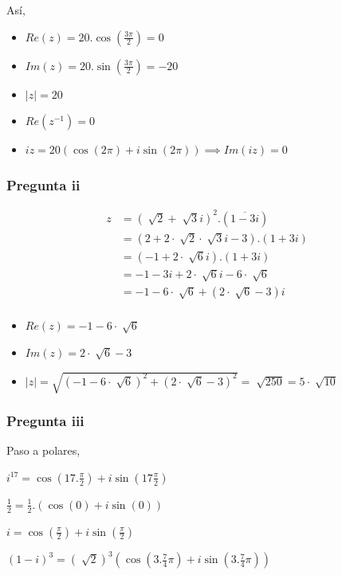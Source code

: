Así,
\begin{itemize}
    \item $ Re(z) = 20. \cos(\frac{3\pi}{2}) = 0 $
    \item $ Im(z) = 20. \sin(\frac{3\pi}{2}) = -20 $
    \item $ |z| = 20 $
    \item $ Re(z^{-1}) = 0 $
    \item $ iz = 20(\cos(2\pi)+i\sin(2\pi)) \implies Im(iz) = 0 $
\end{itemize}

\subsubsection{Pregunta ii}

\begin{align*}
    z &= (\sqrt[]{2} + \sqrt[]{3}i)^2.(\overline{1-3i}) \\
    &= (2 + 2\cdot \sqrt[]{2} \cdot\sqrt[]{3}i - 3).(1 + 3i) \\
    &= (-1 + 2\cdot \sqrt[]{6}i).(1 + 3i) \\
    &= -1 - 3i + 2 \cdot\sqrt[]{6}i - 6 \cdot \sqrt[]{6} \\
    &= -1 - 6 \cdot \sqrt[]{6} + (2 \cdot\sqrt[]{6} - 3)i \\
\end{align*}

\begin{itemize}
    \item $ Re(z) = -1 - 6 \cdot \sqrt[]{6} $
    \item $ Im(z) = 2 \cdot\sqrt[]{6} - 3 $
    \item $ |z| = \sqrt{(-1 - 6 \cdot \sqrt[]{6})^2 + (2 \cdot\sqrt[]{6} - 3)^2} = \sqrt[]{250} = 5\cdot\sqrt[]{10} $
\end{itemize}

\subsubsection{Pregunta iii}

Paso a polares,

$ i^{17} = \cos(17.\frac{\pi}{2}) + i\sin(17\frac{\pi}{2}) $

$ \frac{1}{2} = \frac{1}{2}.(\cos(0) + i\sin(0)) $

$ i = \cos(\frac{\pi}{2}) +i\sin(\frac{\pi}{2}) $

$ (1-i)^3 = (\sqrt[]{2})^3(\cos(3.\frac{7}{4}\pi)+i\sin(3.\frac{7}{4}\pi)) $

